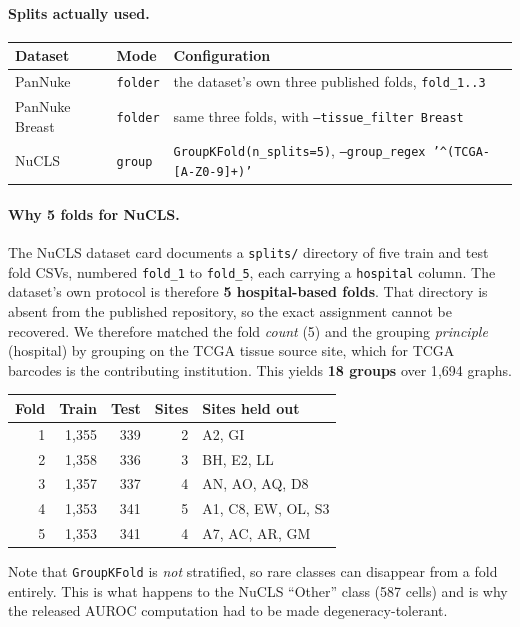 \documentclass[10pt,a4paper]{article}
\begin{document}
\paragraph{Splits actually used.}

\begin{longtable}{@{}p{3.0cm}p{3.4cm}p{9.2cm}@{}}
\toprule
\textbf{Dataset} & \textbf{Mode} & \textbf{Configuration} \\
\midrule \endhead
PanNuke & \texttt{folder} & the dataset's own three published folds, \texttt{fold\_1..3} \\
PanNuke Breast & \texttt{folder} & same three folds, with \texttt{--tissue\_filter Breast} \\
NuCLS & \texttt{group} & \texttt{GroupKFold(n\_splits=5)}, \texttt{--group\_regex '\^{}(TCGA-[A-Z0-9]+)'} \\
\bottomrule
\end{longtable}

\paragraph{Why 5 folds for NuCLS.} The NuCLS dataset card documents a
\texttt{splits/} directory of five train and test fold CSVs, numbered
\texttt{fold\_1} to \texttt{fold\_5}, each carrying a \texttt{hospital} column.
The dataset's own protocol is therefore \textbf{5 hospital-based folds}. That
directory is absent from the
published repository, so the exact assignment cannot be recovered. We therefore
matched the fold \emph{count} (5) and the grouping \emph{principle} (hospital) by
grouping on the TCGA tissue source site, which for TCGA barcodes is the
contributing institution. This yields \textbf{18 groups} over 1{,}694 graphs.

\begin{longtable}{@{}rrrrp{6.4cm}@{}}
\toprule
\textbf{Fold} & \textbf{Train} & \textbf{Test} & \textbf{Sites} & \textbf{Sites held out} \\
\midrule \endhead
1 & 1{,}355 & 339 & 2 & A2, GI \\
2 & 1{,}358 & 336 & 3 & BH, E2, LL \\
3 & 1{,}357 & 337 & 4 & AN, AO, AQ, D8 \\
4 & 1{,}353 & 341 & 5 & A1, C8, EW, OL, S3 \\
5 & 1{,}353 & 341 & 4 & A7, AC, AR, GM \\
\bottomrule
\end{longtable}

\noindent Note that \texttt{GroupKFold} is \emph{not} stratified, so rare classes
can disappear from a fold entirely. This is what happens to the NuCLS ``Other''
class (587 cells) and is why the released AUROC computation had to be made
degeneracy-tolerant.
\end{document}
